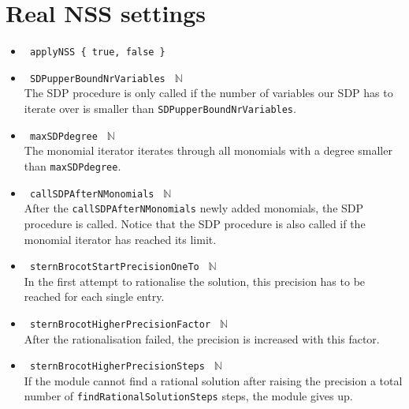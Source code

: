 \section*{Real NSS settings}
\begin{itemize}
 \item \small{\begin{verbatim} applyNSS { true, false } \end{verbatim}}
 \item \small{\verb| SDPupperBoundNrVariables | $\mathbb{N}$} \\
 The SDP procedure is only called if the number of variables our SDP has to iterate over is smaller than \verb|SDPupperBoundNrVariables|.
 \item \small{\verb| maxSDPdegree | $\mathbb{N}$} \\
 The monomial iterator iterates through all monomials with a degree smaller than \verb|maxSDPdegree|.
 \item \small{\verb| callSDPAfterNMonomials | $\mathbb{N}$} \\
 After the \verb|callSDPAfterNMonomials| newly added monomials,  the SDP procedure is called. Notice that the SDP procedure is also called if the monomial iterator has reached its limit.
 \item \small{\verb| sternBrocotStartPrecisionOneTo | $\mathbb{N}$} \\
In the first attempt to rationalise the solution, this precision has to be reached for each single entry.
 \item \small{\verb| sternBrocotHigherPrecisionFactor | $\mathbb{N}$} \\
After the rationalisation failed, the precision is increased with this factor.
 \item \small{\verb| sternBrocotHigherPrecisionSteps | $\mathbb{N}$} \\
If the module cannot find a rational solution after raising the precision a total number of \verb|findRationalSolutionSteps| steps, the module gives up.
\end{itemize}


